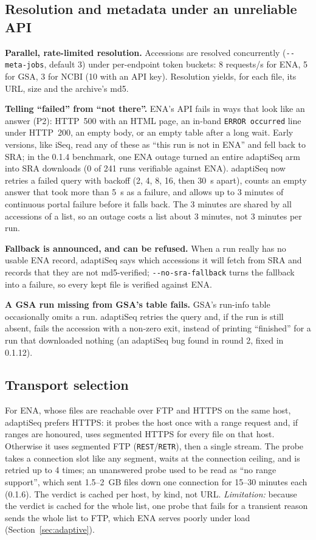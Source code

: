 \documentclass[11pt,a4paper]{article}
\newcommand{\code}[1]{\texttt{#1}}
\newcommand{\secref}[1]{Section~\ref{#1}}
\begin{document}
\subsection{Resolution and metadata under an unreliable API}
\label{sec:resolve}
\textbf{Parallel, rate-limited resolution.} Accessions are resolved concurrently (\code{-{}-meta-jobs}, default 3)
under per-endpoint token buckets: 8 requests/s for ENA, 5 for GSA, 3 for NCBI (10 with an API key). Resolution
yields, for each file, its URL, size and the archive's md5.

\textbf{Telling ``failed'' from ``not there''.} ENA's API fails in ways that look like an answer (P2): HTTP~500 with
an HTML page, an in-band \code{ERROR occurred} line under HTTP~200, an empty body, or an empty table after a long
wait. Early versions, like iSeq, read any of these as ``this run is not in ENA'' and fell back to SRA; in the 0.1.4
benchmark, one ENA outage turned an entire adaptiSeq arm into SRA downloads (0 of 241 runs verifiable against ENA).
adaptiSeq now retries a failed query with backoff (2, 4, 8, 16, then 30~s apart), counts an empty answer that took
more than 5~s as a failure, and allows up to 3 minutes of continuous portal failure before it falls back. The 3
minutes are shared by all accessions of a list, so an outage costs a list about 3 minutes, not 3 minutes per run.

\textbf{Fallback is announced, and can be refused.} When a run really has no usable ENA record, adaptiSeq says which
accessions it will fetch from SRA and records that they are not md5-verified; \code{-{}-no-sra-fallback} turns the
fallback into a failure, so every kept file is verified against ENA.

\textbf{A GSA run missing from GSA's table fails.} GSA's run-info table occasionally omits a run. adaptiSeq retries
the query and, if the run is still absent, fails the accession with a non-zero exit, instead of printing ``finished''
for a run that downloaded nothing (an adaptiSeq bug found in round 2, fixed in 0.1.12).

\subsection{Transport selection}
For ENA, whose files are reachable over FTP and HTTPS on the same host, adaptiSeq prefers HTTPS: it probes the host
once with a range request and, if ranges are honoured, uses segmented HTTPS for every file on that host. Otherwise
it uses segmented FTP (\code{REST}/\code{RETR}), then a single stream. The probe takes a connection slot like any
segment, waits at the connection ceiling, and is retried up to 4 times; an unanswered probe used to be read as ``no
range support'', which sent 1.5--2~GB files down one connection for 15--30 minutes each (0.1.6). The verdict is cached
per host, by kind, not URL. \emph{Limitation:} because the verdict is cached for the whole list, one probe that fails
for a transient reason sends the whole list to FTP, which ENA serves poorly under load (\secref{sec:adaptive}).
\end{document}
